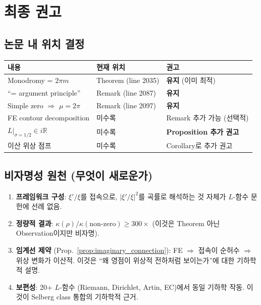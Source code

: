 \documentclass[11pt]{article}
\begin{document}
\section{최종 권고}

\subsection{논문 내 위치 결정}

\begin{center}
\begin{tabular}{lll}
\hline
내용 & 현재 위치 & 권고 \\
\hline
Monodromy = $2\pi m$ & Theorem (line 2035) & \textbf{유지} (이미 최적) \\
``= argument principle'' & Remark (line 2087) & \textbf{유지} \\
Simple zero $\Rightarrow$ $\mu=2\pi$ & Remark (line 2097) & \textbf{유지} \\
FE contour decomposition & 미수록 & Remark 추가 가능 (선택적) \\
$L|_{\sigma=1/2} \in i\mathbb{R}$ & 미수록 & \textbf{Proposition 추가 권고} \\
이산 위상 점프 & 미수록 & Corollary로 추가 권고 \\
\hline
\end{tabular}
\end{center}

\subsection{비자명성 원천 (무엇이 새로운가)}

\begin{enumerate}
  \item \textbf{프레임워크 구성}: $\xi'/\xi$를 접속으로, $|\xi'/\xi|^2$를 곡률로
    해석하는 것 자체가 $L$-함수 문헌에 선례 없음.
  \item \textbf{정량적 결과}: $\kappa(\rho)/\kappa(\text{non-zero}) \geq 300\times$
    (이것은 Theorem 아닌 Observation이지만 비자명).
  \item \textbf{임계선 제약} (Prop.~\ref{prop:imaginary_connection}):
    FE $\Rightarrow$ 접속이 순허수 $\Rightarrow$ 위상 변화가 이산적.
    이것은 ``왜 영점이 위상적 전하처럼 보이는가''에 대한 기하학적 설명.
  \item \textbf{보편성}: 20+ $L$-함수 (Riemann, Dirichlet, Artin, EC)에서
    동일 기하학 작동. 이것이 Selberg class 통합의 기하학적 근거.
\end{enumerate}
\end{document}
